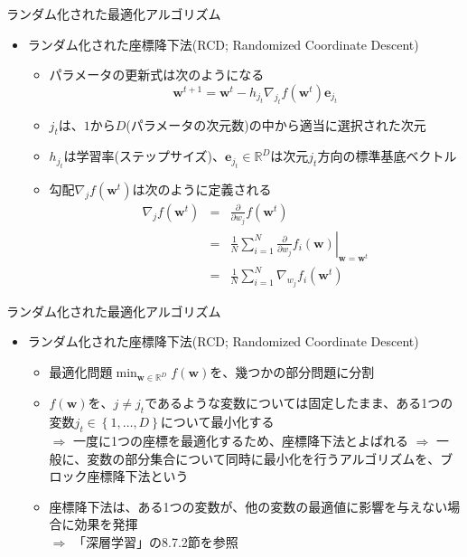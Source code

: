 \documentclass[dvipdfmx,notheorems,t]{beamer}
\begin{document}
\begin{frame}{ランダム化された最適化アルゴリズム}

\begin{itemize}
	\item ランダム化された座標降下法(RCD; Randomized Coordinate Descent)
	\begin{itemize}
		\item パラメータの更新式は次のようになる
		\begin{equation}
			\bm{w}^{t + 1} = \bm{w}^t - h_{j_t} \nabla_{j_t} f(\bm{w}^t) \bm{e}_{j_t}
		\end{equation}
		
		\item $j_t$は、$1$から$D$(パラメータの次元数)の中から適当に選択された次元
		\item $h_{j_t}$は学習率(ステップサイズ)、$\bm{e}_{j_t} \in \mathbb{R}^D$は次元$j_t$方向の標準基底ベクトル
		\item 勾配$\nabla_j f(\bm{w}^t)$は次のように定義される
		\begin{eqnarray}
			\nabla_j f(\bm{w}^t) &=& \frac{\partial}{\partial w_j} f(\bm{w}^t) \\
			&=& \frac{1}{N} \sum_{i = 1}^N \left. \frac{\partial}{\partial w_j} f_i(\bm{w}) \right|_{\bm{w} = \bm{w}^t} \\
			&=& \frac{1}{N} \sum_{i = 1}^N \nabla_{w_j} f_i(\bm{w}^t)
		\end{eqnarray}
	\end{itemize}
\end{itemize}

\end{frame}

\begin{frame}{ランダム化された最適化アルゴリズム}

\begin{itemize}
	\item ランダム化された座標降下法(RCD; Randomized Coordinate Descent)
	\begin{itemize}
		\item 最適化問題$\displaystyle \min_{\bm{w} \in \mathbb{R}^D} f(\bm{w})$を、幾つかの部分問題に分割
		\newline
		
		\item $f(\bm{w})$を、$j \neq j_t$であるような変数については固定したまま、ある1つの変数$j_t \in \left\{ 1, \ldots, D \right\}$について最小化する \\
		$\Rightarrow$ 一度に1つの座標を最適化するため、\alert{座標降下法}とよばれる \newline \newline
		$\Rightarrow$ 一般に、変数の部分集合について同時に最小化を行うアルゴリズムを、\alert{ブロック座標降下法}という
		\newline
		
		\item 座標降下法は、ある1つの変数が、他の変数の最適値に影響を与えない場合に効果を発揮 \\
		$\Rightarrow$ 「深層学習」の8.7.2節を参照
	\end{itemize}
\end{itemize}

\end{frame}
\end{document}
